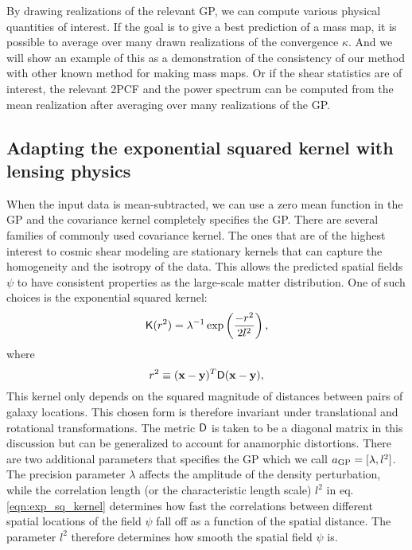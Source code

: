 By drawing realizations of the relevant GP, we can compute various 
physical quantities of interest. If the goal is to give a best prediction of a
mass map, it is possible to average over many drawn realizations of the
convergence $\kappa$. And we will show an example of this as a demonstration of
the consistency of our method with other known method for making mass maps.
Or if the shear statistics are of interest, the relevant 2PCF and the power
spectrum can be computed from the mean realization 
after averaging over many realizations of the GP.

\subsection{Adapting the exponential squared kernel with lensing physics}
When the input data is mean-subtracted, we can use a zero mean function in the
GP and the covariance kernel completely specifies the GP. 
There are several families of commonly used covariance kernel.
The ones that are of the highest interest to cosmic shear modeling 
are stationary kernels that can capture 
the homogeneity and the isotropy of the data. This allows the predicted spatial fields
$\psi$ to have consistent properties as the large-scale matter distribution.
%
One of such choices is the exponential squared kernel: 
\begin{equation}
	\mathsf{K}(r^2) = \lambda^{-1} \exp\left(\frac{-r^2}{2 l^2}\right),
	\label{eqn:exp_sq_kernel}
\end{equation}
where 
\begin{equation}
	r^2 \equiv (\mathbf{x} - \mathbf{y})^T \mathsf{D} (\mathbf{x} - \mathbf{y}), 
\end{equation}
This kernel only depends on the
squared magnitude of distances between pairs of galaxy locations. 
This chosen form is therefore invariant
under translational and rotational transformations.
The metric $\mathsf{D}$ is taken to be a diagonal matrix in this discussion but  
can be generalized to account for anamorphic distortions. There are two
additional parameters that specifies the GP which we call $a_{\rm GP} =
[\lambda, l^2]$.
The precision parameter $\lambda$ affects the 
amplitude of the density perturbation, while the correlation length (or
the characteristic length scale) $l^2$ in eq. \ref{eqn:exp_sq_kernel} 
determines how fast the correlations between different spatial locations of the
field $\psi$ fall off as a function of the spatial distance. The parameter
$l^2$ therefore determines how smooth the spatial field $\psi$ is. 

